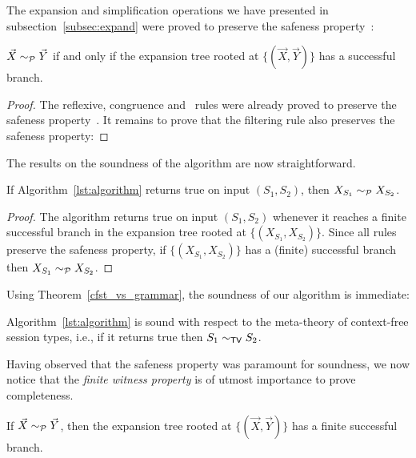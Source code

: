 The expansion and simplification operations we have presented in 
subsection~\ref{subsec:expand} were proved to preserve the safeness 
property~\cite{janvcar1999techniques}:

\begin{proposition} 
\label{safeness}
	$\vec X \sim_{\mathcal{P}} \vec Y$ if and only if the expansion tree rooted 
	at $\{(\vec X, \vec Y)\}$ has a successful branch.
\end{proposition}

\begin{proof}
	The reflexive, congruence and \BPA\ rules were already proved to 
	preserve the safeness property~\cite{janvcar1999techniques}.
	It remains to prove that the filtering rule also preserves 
	the safeness property: 
\end{proof}

The results on the soundness of the algorithm are now straightforward. 

\begin{theorem}
	If Algorithm~\ref{lst:algorithm} returns \textsf{true} on input 
	$(S_1,S_2)$, then $X_{S_1} \sim_{\mathcal{P}} X_{S_2}$.
\end{theorem}

\begin{proof}
	The algorithm returns \textsf{true} on input $(S_1,S_2)$ whenever 
	it reaches a finite successful branch in the expansion tree rooted 
	at $\{(X_{S_1}, X_{S_2})\}$. Since all rules preserve the safeness 
	property, if $\{(X_{S_1}, X_{S_2})\}$ has a (finite) successful 
	branch then $X_{S_1} \sim_{\mathcal{P}} X_{S_2}$.
\end{proof}

Using Theorem~\ref{cfst_vs_grammar}, the soundness of our algorithm is 
immediate:

\begin{theorem}
	Algorithm~\ref{lst:algorithm} is sound with respect to the meta-theory 
	of context-free session types, i.e., if it returns \textsf{true} then $S_1 \sim_{\mathsf{TV}} S_2$.
\end{theorem}

Having observed that the safeness property was paramount for soundness, 
we now notice that the \emph{finite witness property} is of utmost 
importance to prove completeness.

\begin{proposition} 
\label{finite_witness}
	If $\vec X \sim_{\mathcal{P}} \vec Y$, then the expansion tree rooted at 
	$\{(\vec X, \vec Y)\}$ has a finite successful branch.
\end{proposition}

